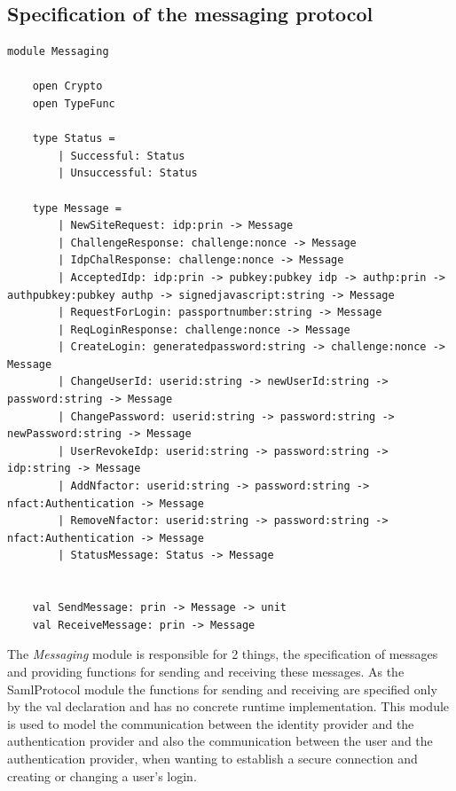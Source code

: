 \documentclass[twosided]{report}
\begin{document}
\subsection{Specification of the messaging protocol}
\begin{lstlisting}[style=fstar, caption={Specification of the Messaging protocol}]
	module Messaging
	
	open Crypto
	open TypeFunc

	type Status =
		| Successful: Status
		| Unsuccessful: Status

	type Message =
		| NewSiteRequest: idp:prin -> Message
		| ChallengeResponse: challenge:nonce -> Message
		| IdpChalResponse: challenge:nonce -> Message
		| AcceptedIdp: idp:prin -> pubkey:pubkey idp -> authp:prin -> authpubkey:pubkey authp -> signedjavascript:string -> Message
		| RequestForLogin: passportnumber:string -> Message
		| ReqLoginResponse: challenge:nonce -> Message
		| CreateLogin: generatedpassword:string -> challenge:nonce -> Message
		| ChangeUserId: userid:string -> newUserId:string -> password:string -> Message
		| ChangePassword: userid:string -> password:string -> newPassword:string -> Message
		| UserRevokeIdp: userid:string -> password:string -> idp:string -> Message
		| AddNfactor: userid:string -> password:string -> nfact:Authentication -> Message
		| RemoveNfactor: userid:string -> password:string -> nfact:Authentication -> Message
		| StatusMessage: Status -> Message


	val SendMessage: prin -> Message -> unit
	val ReceiveMessage: prin -> Message
\end{lstlisting}

The \emph{Messaging} module is responsible for 2 things, the specification of messages and providing functions for sending and receiving these messages. As the SamlProtocol module the functions for sending and receiving are specified only by the val declaration and has no concrete runtime implementation. This module is used to model the communication between the identity provider and the authentication provider and also the communication between the user and the authentication provider, when wanting to establish a secure connection and creating or changing a user's login.

\clearpage
\end{document}
